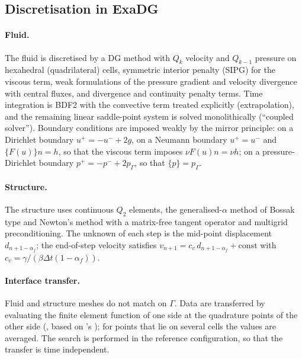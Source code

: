 \documentclass[11pt,a4paper]{article}
\theoremstyle{definition}
\theoremstyle{remark}
\newcommand{\G}{\Gamma}
\begin{document}
\subsection{Discretisation in ExaDG}

\paragraph{Fluid.} The fluid is discretised by a DG method with $Q_k$ velocity and $Q_{k-1}$
pressure on hexahedral (quadrilateral) cells, symmetric interior penalty (SIPG) for the viscous term,
weak formulations of the pressure gradient and velocity divergence with central fluxes, and
divergence and continuity penalty terms. Time integration is BDF2 with the convective term treated
explicitly (extrapolation), and the remaining linear saddle-point system is solved monolithically
(``coupled solver''). Boundary conditions are imposed weakly by the mirror principle: on a Dirichlet
boundary $u^+ = -u^- + 2g$, on a Neumann boundary $u^+=u^-$ and $\{F(u)\}n = h$, so that the
viscous term imposes $\nu F(u)n = \nu h$; on a pressure-Dirichlet boundary $p^+=-p^-+2p_{\G}$, so
that $\{p\}=p_{\G}$.

\paragraph{Structure.} The structure uses continuous $Q_2$ elements, the generalised-$\alpha$ method
of Bossak type and Newton's method with a matrix-free tangent operator and multigrid preconditioning.
The unknown of each step is the mid-point displacement $d_{n+1-\alpha_f}$; the end-of-step velocity
satisfies $v_{n+1} = c_v\, d_{n+1-\alpha_f} + \text{const}$ with
$c_v = \gamma/(\beta\Delta t(1-\alpha_f))$.

\paragraph{Interface transfer.} Fluid and structure meshes do not match on $\G$. Data are
transferred by evaluating the finite element function of one side at the quadrature points of the
other side (, based on 's ); for
points that lie on several cells the values are averaged. The search is performed in the reference
configuration, so that the transfer is time independent.
\end{document}
